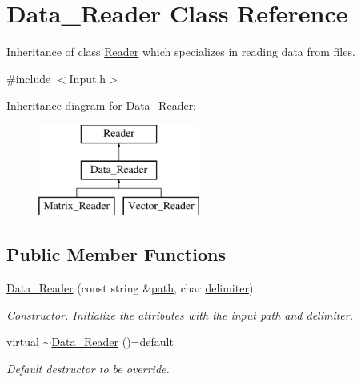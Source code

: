 \hypertarget{class_data___reader}{}\section{Data\+\_\+\+Reader Class Reference}
\label{class_data___reader}


Inheritance of class \mbox{\hyperlink{class_reader}{Reader}} which specializes in reading data from files.  




{\ttfamily \#include $<$Input.\+h$>$}

Inheritance diagram for Data\+\_\+\+Reader\+:\begin{figure}[H]
\begin{center}
\leavevmode
\includegraphics[height=3.000000cm]{class_data___reader}
\end{center}
\end{figure}
\subsection*{Public Member Functions}
\begin{DoxyCompactItemize}
\item 
\mbox{\label{class_data___reader_a8ea116155d708b4516786730fdeb93bb}} 
\mbox{\hyperlink{class_data___reader_a8ea116155d708b4516786730fdeb93bb}{Data\+\_\+\+Reader}} (const string \&\mbox{\hyperlink{class_reader_a4f3eaccb117f248d4649ffb4e793a23d}{path}}, char \mbox{\hyperlink{class_data___reader_ac05700473d754089d7f30d2cc7dccce9}{delimiter}})
\begin{DoxyCompactList}\small\item\em Constructor. Initialize the attributes with the input path and delimiter. \end{DoxyCompactList}\item 
\mbox{\label{class_data___reader_a2c1fa3b33d6bc8aab051878e1d3395cf}} 
virtual \mbox{\hyperlink{class_data___reader_a2c1fa3b33d6bc8aab051878e1d3395cf}{$\sim$\+Data\+\_\+\+Reader}} ()=default
\begin{DoxyCompactList}\small\item\em Default destructor to be override. \end{DoxyCompactList}\end{DoxyCompactItemize}
